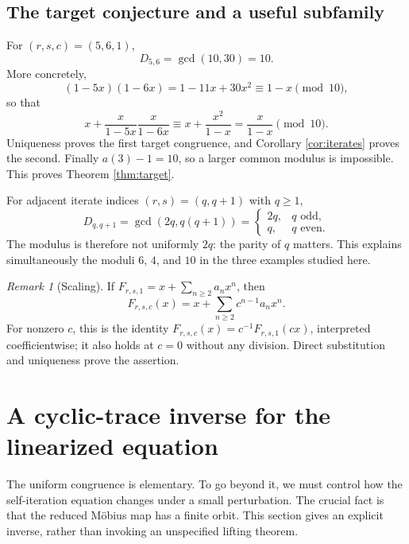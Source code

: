 \documentclass[11pt,letterpaper]{article}
\theoremstyle{definition}
\theoremstyle{remark}
\newtheorem{remark}[theorem]{Remark}
\begin{document}
\subsection{The target conjecture and a useful subfamily}
For $(r,s,c)=(5,6,1)$,
\[
 D_{5,6}=\gcd(10,30)=10.
\]
More concretely,
\[
 (1-5x)(1-6x)=1-11x+30x^2\equiv1-x\pmod {10},
\]
so that
\[
 x+\frac{x}{1-5x}\frac{x}{1-6x}
 \equiv x+\frac{x^2}{1-x}=\frac{x}{1-x}\pmod {10}.
\]
Uniqueness proves the first target congruence, and
Corollary \ref{cor:iterates} proves the second.  Finally $a(3)-1=10$,
so a larger common modulus is impossible.  This proves
Theorem \ref{thm:target}.

For adjacent iterate indices $(r,s)=(q,q+1)$ with $q\geq1$,
\begin{equation}\label{eq:adjacentD}
 D_{q,q+1}=\gcd(2q,q(q+1))
 =\begin{cases}2q,&q\text{ odd},\\q,&q\text{ even}.\end{cases}
\end{equation}
The modulus is therefore not uniformly $2q$: the parity of $q$ matters.
This explains simultaneously the moduli $6$, $4$, and $10$ in the
three examples studied here.

\begin{remark}[Scaling]
If $F_{r,s,1}=x+\sum_{n\geq2}a_nx^n$, then
\[
 F_{r,s,c}(x)=x+\sum_{n\geq2}c^{n-1}a_nx^n.
\]
For nonzero $c$, this is the identity
$F_{r,s,c}(x)=c^{-1}F_{r,s,1}(cx)$, interpreted coefficientwise;
it also holds at $c=0$ without any division.  Direct substitution and
uniqueness prove the assertion.
\end{remark}

\section{A cyclic-trace inverse for the linearized equation}\label{sec:trace}

The uniform congruence is elementary.  To go beyond it, we must control
how the self-iteration equation changes under a small perturbation.
The crucial fact is that the reduced M\"obius map has a finite orbit.
This section gives an explicit inverse, rather than invoking an
unspecified lifting theorem.
\end{document}
